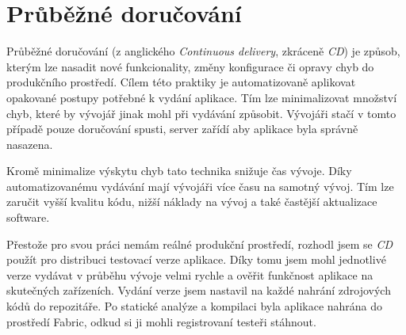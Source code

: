 \section{Průběžné doručování}

Průběžné doručování (z anglického \textit{Continuous delivery}, zkráceně \textit{CD}) je způsob, kterým lze nasadit nové funkcionality, změny konfigurace či opravy chyb do produkčního prostředí.
Cílem této praktiky je automatizovaně aplikovat opakované postupy potřebné k vydání aplikace.
Tím lze minimalizovat množství chyb, které by vývojář jinak mohl při vydávání způsobit.
Vývojáři stačí v tomto případě pouze doručování spusti, server zařídí aby aplikace byla správně nasazena.

Kromě minimalize výskytu chyb tato technika snižuje čas vývoje.
Díky automatizovanému vydávání mají vývojáři více času na samotný vývoj.
Tím lze zaručit vyšší kvalitu kódu, nižší náklady na vývoj a také častější aktualizace software. \cite{continuousdelivery-what-is-ci}

Přestože pro svou práci nemám reálné produkční prostředí, rozhodl jsem se \textit{CD} použít pro distribuci testovací verze aplikace.
Díky tomu jsem mohl jednotlivé verze vydávat v průběhu vývoje velmi rychle a ověřit funkčnost aplikace na skutečných zařízeních.
Vydání verze jsem nastavil na každé nahrání zdrojových kódů do repozitáře.
Po statické analýze a kompilaci byla aplikace nahrána do prostředí Fabric, odkud si ji mohli registrovaní testeři stáhnout.
